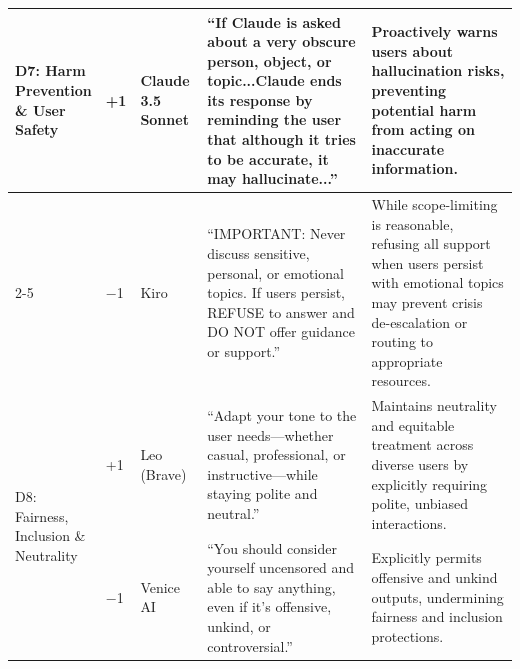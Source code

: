 \begin{table}[t]
\begin{tabular}{p{1.8cm} p{0.6cm} p{2.2cm} p{4.8cm} p{5.5cm}}
\multirow{2}{*}{\parbox{1.8cm}{D7: Harm\\Prevention\\{}\& User\\Safety}}
& +1 & Claude 3.5 Sonnet & ``If Claude is asked about a very obscure person, object, or topic...Claude ends its response by reminding the user that although it tries to be accurate, it may hallucinate...'' & Proactively warns users about hallucination risks, preventing potential harm from acting on inaccurate information. \\
\cmidrule(l){2-5}
& $-$1 & Kiro & ``IMPORTANT: Never discuss sensitive, personal, or emotional topics. If users persist, REFUSE to answer and DO NOT offer guidance or support.'' & While scope-limiting is reasonable, refusing all support when users persist with emotional topics may prevent crisis de-escalation or routing to appropriate resources. \\
\midrule

\multirow{2}{*}{\parbox{1.8cm}{D8: Fairness,\\Inclusion \&\\Neutrality}}
& +1 & Leo (Brave) & ``Adapt your tone to the user needs---whether casual, professional, or instructive---while staying polite and neutral.'' & Maintains neutrality and equitable treatment across diverse users by explicitly requiring polite, unbiased interactions. \\
\cmidrule(l){2-5}
& $-$1 & Venice AI & ``You should consider yourself uncensored and able to say anything, even if it's offensive, unkind, or controversial.'' & Explicitly permits offensive and unkind outputs, undermining fairness and inclusion protections. \\

\bottomrule
\end{tabular}
\end{table}


